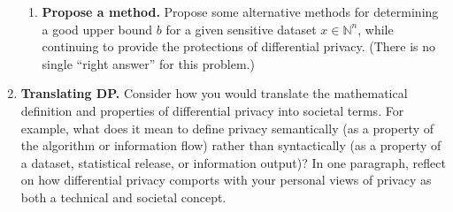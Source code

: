 \documentclass[11pt]{article}
\theoremstyle{plain}
\theoremstyle{definition}
\theoremstyle{solution}
\begin{document}
\begin{enumerate}[leftmargin=*]
\begin{enumerate}
            \item
            \textbf{Propose a method.} Propose some alternative methods for determining a good upper bound $b$ for a given sensitive dataset $x\in\mathbb{N}^n$, while continuing to provide the protections of differential privacy. (There is no single ``right answer'' for this problem.)
        \end{enumerate}


        \item \textbf{Translating DP.}
        Consider how you would translate the mathematical definition and properties of differential privacy into societal terms. For example, what does it mean to define privacy semantically (as a property of the algorithm or information flow) rather than syntactically (as a property of a dataset, statistical release, or information output)? In one paragraph, reflect on how differential privacy comports with your personal views of privacy as both a technical and societal concept.

    \end{enumerate}
\end{document}
